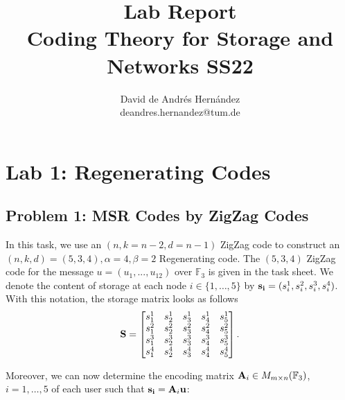 \documentclass{article}
\title{Lab Report\\
\large Coding Theory for Storage and Networks SS22}
\author{David de Andrés Hernández\\
\small deandres.hernandez@tum.de}
\date{} %
\begin{document}
\maketitle


\section*{Lab 1: Regenerating Codes}
\subsection*{Problem 1: MSR Codes by ZigZag Codes}
In this task, we use an $(n,k = n-2, d=n-1)$ ZigZag code \cite{ZigZag_Codes} to construct an $(n, k, d) = (5,3,4), \alpha =4 , \beta = 2$ Regenerating code. The $(5, 3, 4)$ ZigZag code for the message $u = (u_1,..., u_{12})$ over $\mathbb{F}_3$ is given  in the task sheet.
\noindent We denote the content of storage at each node $i \in \{1,\ldots, 5\}$ by $\vb{s_i}= (s_i^1, s_i^2, s_i^3, s_i^4)$. With this notation, the storage matrix looks as follows
\begin{equation*}
\vb{S} = 
\begin{bmatrix}
s_1^1 & s_2^1 & s_3^1 & s_4^1 & s_5^1 \\
s_1^2 & s_2^2 & s_3^2 & s_4^2 & s_5^2 \\
s_1^3 & s_2^3 & s_3^3 & s_4^3 & s_5^3 \\
s_1^4 & s_2^4 & s_3^4 & s_4^4 & s_5^4
\end{bmatrix}.
\end{equation*}

Moreover, we can now determine the encoding matrix $\vb{A}_i \in M_{m \times n}(\mathbb{F}_3)$, $i = 1, \ldots,5$ of each user such that $\vb{s_i}= \vb{A}_i\vb{u}$:
\end{document}
